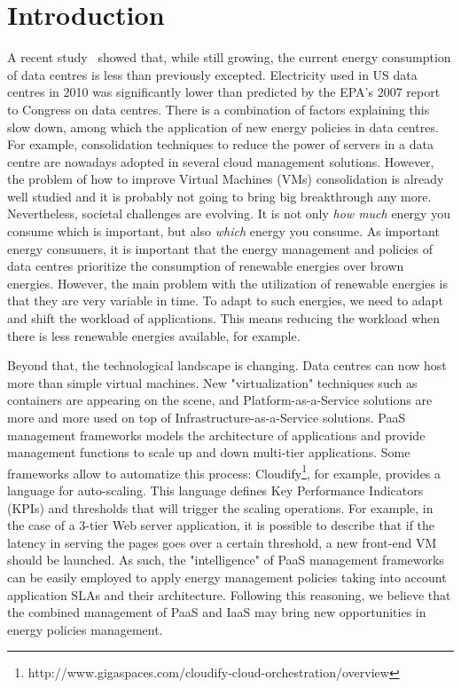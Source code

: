 \section{Introduction}
\label{sec: intro}

A recent study~\cite{koomey2011} showed that, while still growing, the current energy consumption of data centres is less than previously excepted.
Electricity used in US data centres in 2010 was significantly lower than predicted by the EPA’s 2007 report to Congress on data centres.
There is a combination of factors explaining this slow down, among which the application of new energy policies in data centres.
For example, consolidation techniques to reduce the power of servers in a data centre are nowadays adopted in several cloud management solutions.
However, the problem of how to improve Virtual Machines (VMs) consolidation is already well studied and it is probably not going to bring big breakthrough any more.
Nevertheless, societal challenges are evolving.
It is not only \emph{how much} energy you consume which is important, but also \emph{which} energy you consume. 
As important energy consumers, it is important that the energy management and policies of data centres prioritize the consumption of renewable energies over brown energies.
However, the main problem with the utilization of renewable energies is that they are very variable in time.
To adapt to such energies, we need to adapt and shift the workload of applications.
This means reducing the workload when there is less renewable energies available, for example.

Beyond that, the technological landscape is changing.
Data centres can now host more than simple virtual machines.
New "virtualization" techniques such as containers are appearing on the scene, and Platform-as-a-Service solutions are more and more used on top of Infrastructure-as-a-Service solutions.
PaaS management frameworks models the architecture of applications and provide management functions to scale up and down multi-tier applications. 
Some frameworks allow to automatize this process: Cloudify\footnote{http://www.gigaspaces.com/cloudify-cloud-orchestration/overview}, for example, provides a language for auto-scaling.
This language defines Key Performance Indicators (KPIs) and thresholds that will trigger the scaling operations.
For example, in the case of a 3-tier Web server application, it is possible to describe that if the latency in serving the pages goes over a certain threshold, a new front-end VM should be launched.
As such, the "intelligence" of PaaS management frameworks can be easily employed to apply energy management policies taking into account application SLAs and their architecture.
Following this reasoning, we believe that the combined management of PaaS and IaaS may bring new opportunities in energy policies management.

